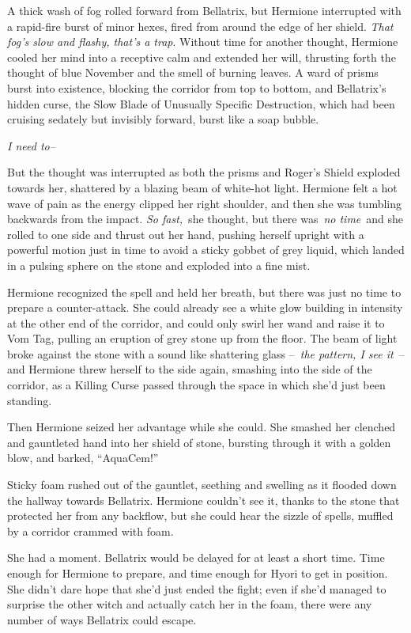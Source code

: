A thick wash of fog rolled forward from Bellatrix, but Hermione
interrupted with a rapid-fire burst of minor hexes, fired from around
the edge of her shield. \emph{That fog's slow and flashy, that's a
trap}. Without time for another thought, Hermione cooled her mind into a
receptive calm and extended her will, thrusting forth the thought of
blue November and the smell of burning leaves. A ward of prisms burst
into existence, blocking the corridor from top to bottom, and
Bellatrix's hidden curse, the Slow Blade of Unusually Specific
Destruction, which had been cruising sedately but invisibly forward,
burst like a soap bubble.

\emph{I need to--}

But the thought was interrupted as both the prisms and Roger's Shield
exploded towards her, shattered by a blazing beam of white-hot light.
Hermione felt a hot wave of pain as the energy clipped her right
shoulder, and then she was tumbling backwards from the impact. \emph{So
fast,}~she thought, but there was~\emph{no time}~and she rolled to one
side and thrust out her hand, pushing herself upright with a powerful
motion just in time to avoid a sticky gobbet of grey liquid, which
landed in a pulsing sphere on the stone and exploded into a fine mist.

Hermione recognized the spell and held her breath, but there was just no
time to prepare a counter-attack. She could already see a white glow
building in intensity at the other end of the corridor, and could only
swirl her wand and raise it to Vom Tag, pulling an eruption of grey
stone up from the floor. The beam of light broke against the stone with
a sound like shattering glass --~\emph{the pattern, I see it}~-- and
Hermione threw herself to the side again, smashing into the side of the
corridor, as a Killing Curse passed through the space in which she'd
just been standing.

Then Hermione seized her advantage while she could. She smashed her
clenched and gauntleted hand into her shield of stone, bursting through
it with a golden blow, and barked, ``AquaCem!''

Sticky foam rushed out of the gauntlet, seething and swelling as it
flooded down the hallway towards Bellatrix. Hermione couldn't see it,
thanks to the stone that protected her from any backflow, but she could
hear the sizzle of spells, muffled by a corridor crammed with foam.

She had a moment. Bellatrix would be delayed for at least a short time.
Time enough for Hermione to prepare, and time enough for Hyori to get in
position. She didn't dare hope that she'd just ended the fight; even if
she'd managed to surprise the other witch and actually catch her in the
foam, there were any number of ways Bellatrix could escape.


